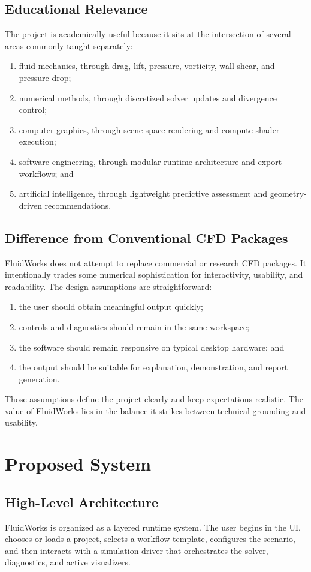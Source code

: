 \documentclass[12pt,a4paper,titlepage]{report}
\begin{document}
\section{Educational Relevance}
The project is academically useful because it sits at the intersection of several areas commonly taught separately:
\begin{enumerate}
\item fluid mechanics, through drag, lift, pressure, vorticity, wall shear, and pressure drop;
\item numerical methods, through discretized solver updates and divergence control;
\item computer graphics, through scene-space rendering and compute-shader execution;
\item software engineering, through modular runtime architecture and export workflows; and
\item artificial intelligence, through lightweight predictive assessment and geometry-driven recommendations.
\end{enumerate}

\section{Difference from Conventional CFD Packages}
FluidWorks does not attempt to replace commercial or research CFD packages. It intentionally trades some numerical sophistication for interactivity, usability, and readability. The design assumptions are straightforward:
\begin{enumerate}
\item the user should obtain meaningful output quickly;
\item controls and diagnostics should remain in the same workspace;
\item the software should remain responsive on typical desktop hardware; and
\item the output should be suitable for explanation, demonstration, and report generation.
\end{enumerate}

Those assumptions define the project clearly and keep expectations realistic. The value of FluidWorks lies in the balance it strikes between technical grounding and usability.

\chapter{Proposed System}
\section{High-Level Architecture}
FluidWorks is organized as a layered runtime system. The user begins in the UI, chooses or loads a project, selects a workflow template, configures the scenario, and then interacts with a simulation driver that orchestrates the solver, diagnostics, and active visualizers.
\end{document}
